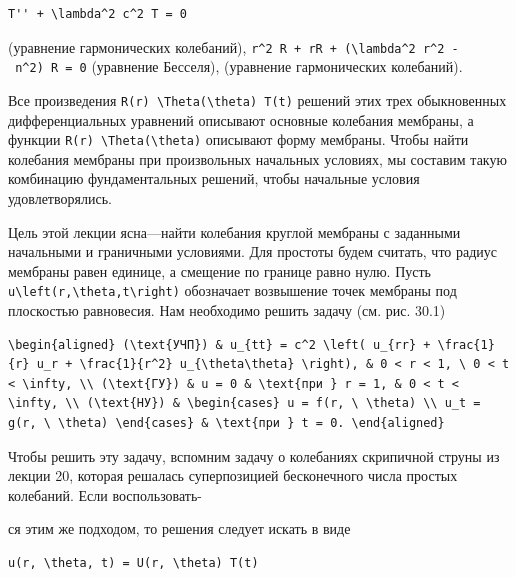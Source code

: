 \documentclass[
  ukrainian,
]{article}
\begin{document}
\begin{verbatim}
T'' + \lambda^2 c^2 T = 0
\end{verbatim}

(уравнение гармонических колебаний),
\texttt{r\^{}2\ R\textquotesingle{}\textquotesingle{}\ +\ rR\textquotesingle{}\ +\ (\textbackslash{}lambda\^{}2\ r\^{}2\ -\ n\^{}2)\ R\ =\ 0}
(уравнение Бесселя), (уравнение гармонических колебаний).

Все произведения
\texttt{R(r)\ \textbackslash{}Theta(\textbackslash{}theta)\ T(t)}
решений этих трех обыкновенных дифференциальных уравнений описывают
основные колебания мембраны, а функции
\texttt{R(r)\ \textbackslash{}Theta(\textbackslash{}theta)} описывают
форму мембраны. Чтобы найти колебания мембраны при произвольных
начальных условиях, мы составим такую комбинацию фундаментальных
решений, чтобы начальные условия удовлетворялись.

Цель этой лекции ясна---найти колебания круглой мембраны с заданными
начальными и граничными условиями. Для простоты будем считать, что
радиус мембраны равен единице, а смещение по границе равно нулю. Пусть
\texttt{u\textbackslash{}left(r,\textbackslash{}theta,t\textbackslash{}right)}
обозначает возвышение точек мембраны под плоскостью равновесия. Нам
необходимо решить задачу (см. рис. 30.1)

\begin{verbatim}
\begin{aligned} (\text{УЧП}) & u_{tt} = c^2 \left( u_{rr} + \frac{1}{r} u_r + \frac{1}{r^2} u_{\theta\theta} \right), & 0 < r < 1, \ 0 < t < \infty, \\ (\text{ГУ}) & u = 0 & \text{при } r = 1, & 0 < t < \infty, \\ (\text{НУ}) & \begin{cases} u = f(r, \ \theta) \\ u_t = g(r, \ \theta) \end{cases} & \text{при } t = 0. \end{aligned}
\end{verbatim}

Чтобы решить эту задачу, вспомним задачу о колебаниях скрипичной струны
из лекции 20, которая решалась суперпозицией бесконечного числа простых
колебаний. Если воспользовать-

ся этим же подходом, то решения следует искать в виде

\begin{verbatim}
u(r, \theta, t) = U(r, \theta) T(t)
\end{verbatim}
\end{document}
